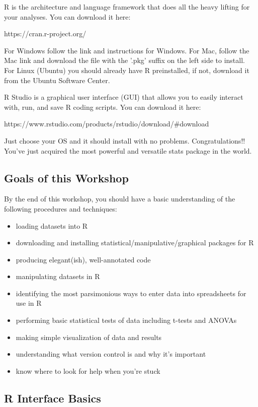 \documentclass{article}
\begin{document}
\bigskip
R is the architecture and language framework that does all the heavy lifting for your analyses. You can download it here:

\bigskip
	https://cran.r-project.org/
	
\bigskip
For Windows follow the link and instructions for Windows. For Mac, follow the Mac link and download the file with the '.pkg' suffix on the left side to install. For Linux (Ubuntu) you should already have R preinstalled, if not, download it from the Ubuntu Software Center.

\bigskip
R Studio is a graphical user interface (GUI) that allows you to easily interact with, run, and save R coding scripts. You can download it here: 

\bigskip
	https://www.rstudio.com/products/rstudio/download/\#download

\bigskip
Just choose your OS and it should install with no problems. Congratulations!! You’ve just acquired the most powerful and versatile stats package in the world. 

\subsection{Goals of this Workshop}

By the end of this workshop, you should have a basic understanding of the following procedures and techniques:

\begin{itemize}
    \item loading datasets into R
    \item downloading and installing statistical/manipulative/graphical packages for R
    \item producing elegant(ish), well-annotated code
    \item manipulating datasets in R
    \item identifying the most parsimonious ways to enter data into spreadsheets for use in R
    \item performing basic statistical tests of data including t-tests and ANOVAs
    \item making simple visualization of data and results
    \item understanding what version control is and why it's important
    \item know where to look for help when you're stuck
\end{itemize}

\subsection{R Interface Basics}
\end{document}
